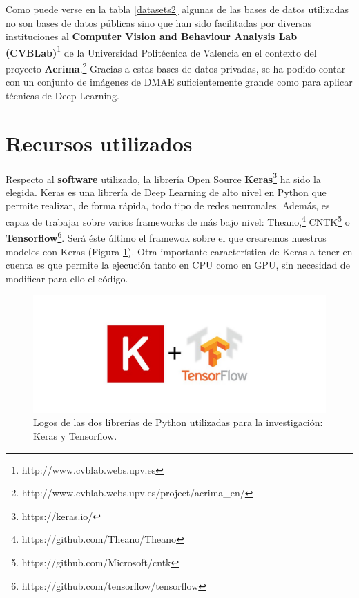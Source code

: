 \documentclass[
  12pt,
  spanish,
  a4paperpaper,
]{report}
\begin{document}
Como puede verse en la tabla \ref{datasets2} algunas de las bases de
datos utilizadas no son bases de datos públicas sino que han sido
facilitadas por diversas instituciones al \textbf{Computer Vision and
Behaviour Analysis Lab (CVBLab)}\footnote{http://www.cvblab.webs.upv.es}
de la Universidad Politécnica de Valencia en el contexto del proyecto
\textbf{Acrima}.\footnote{http://www.cvblab.webs.upv.es/project/acrima\_en/}
Gracias a estas bases de datos privadas, se ha podido contar con un
conjunto de imágenes de DMAE suficientemente grande como para aplicar
técnicas de Deep Learning.

\hypertarget{recursos-utilizados}{%
\section{Recursos utilizados}\label{recursos-utilizados}}

Respecto al \textbf{software} utilizado, la librería Open Source
\textbf{Keras}\footnote{https://keras.io/} ha sido la elegida. Keras es
una librería de Deep Learning de alto nivel en Python que permite
realizar, de forma rápida, todo tipo de redes neuronales. Además, es
capaz de trabajar sobre varios frameworks de más bajo nivel:
Theano,\footnote{https://github.com/Theano/Theano} CNTK\footnote{https://github.com/Microsoft/cntk}
o \textbf{Tensorflow}\footnote{https://github.com/tensorflow/tensorflow}.
Será éste último el framewok sobre el que crearemos nuestros modelos con
Keras (Figura \ref{keras}). Otra importante característica de Keras a
tener en cuenta es que permite la ejecución tanto en CPU como en GPU,
sin necesidad de modificar para ello el código.

\begin{figure}
\centering
\includegraphics[width=1\textwidth,height=\textheight]{source/figures/keras.jpeg}
\caption{Logos de las dos librerías de Python utilizadas para la
investigación: Keras y Tensorflow. \label{keras}}
\end{figure}
\end{document}
